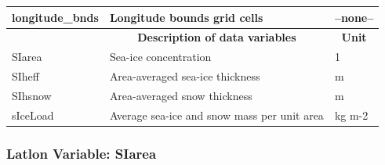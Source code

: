 \begin{longtable}{|m{}|m{}|m{}|}
longitude\_bnds &Longitude bounds grid cells &--none--  \\ \hline
\rowcolor{lightgray} \multicolumn{1}{|c|}{\textbf{Variables}} & \multicolumn{1}{|c|}{\textbf{Description of data variables}} &  \multicolumn{1}{|c|}{\textbf{Unit}}\\ \hline
SIarea &Sea-ice concentration &1  \\ \hline
SIheff &Area-averaged sea-ice thickness &m  \\ \hline
SIhsnow &Area-averaged snow thickness &m  \\ \hline
sIceLoad &Average sea-ice and snow mass per unit area &kg m-2  \\ \hline
\end{longtable}

\newp
\pagebreak
\subsubsection{Latlon Variable: SIarea}
